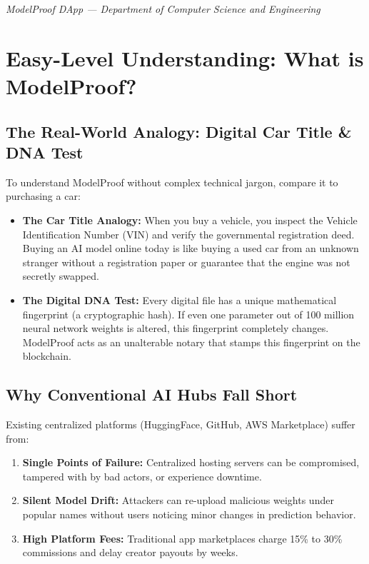 \documentclass[11pt,a4paper]{article}
\begin{document}
\vfill
\begin{center}
    {\footnotesize \textit{ModelProof DApp --- Department of Computer Science and Engineering}}
\end{center}

\clearpage

\section{Easy-Level Understanding: What is ModelProof?}

\subsection{The Real-World Analogy: Digital Car Title \& DNA Test}
To understand ModelProof without complex technical jargon, compare it to purchasing a car:
\begin{itemize}[leftmargin=1.5em]
    \item \textbf{The Car Title Analogy:} When you buy a vehicle, you inspect the Vehicle Identification Number (VIN) and verify the governmental registration deed. Buying an AI model online today is like buying a used car from an unknown stranger without a registration paper or guarantee that the engine was not secretly swapped.
    \item \textbf{The Digital DNA Test:} Every digital file has a unique mathematical fingerprint (a cryptographic hash). If even one parameter out of 100 million neural network weights is altered, this fingerprint completely changes. ModelProof acts as an unalterable notary that stamps this fingerprint on the blockchain.
\end{itemize}

\subsection{Why Conventional AI Hubs Fall Short}
Existing centralized platforms (HuggingFace, GitHub, AWS Marketplace) suffer from:
\begin{enumerate}[leftmargin=1.5em]
    \item \textbf{Single Points of Failure:} Centralized hosting servers can be compromised, tampered with by bad actors, or experience downtime.
    \item \textbf{Silent Model Drift:} Attackers can re-upload malicious weights under popular names without users noticing minor changes in prediction behavior.
    \item \textbf{High Platform Fees:} Traditional app marketplaces charge 15\% to 30\% commissions and delay creator payouts by weeks.
\end{enumerate}
\end{document}

